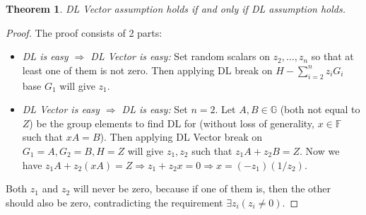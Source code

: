 \documentclass{article}
\newtheorem{theorem}{Theorem}[section]
\begin{document}
\begin{theorem}
DL Vector assumption holds if and only if DL assumption holds.
\end{theorem}
\begin{proof}
The proof consists of 2 parts:
    \begin{itemize}
    \item \textit{DL is easy $\Rightarrow$ DL Vector is easy:} Set random scalars on $z_2,\ldots,z_n$ so that at least one of them is not zero. Then applying DL break on $H - \sum_{i=2}^{n}{z_i G_i}$ base $G_1$ will give $z_1$.
    \item \textit{DL Vector is easy $\Rightarrow$ DL is easy:} Set $n=2$. Let $A, B\in\mathbb{G}$ (both not equal to $Z$) be the group elements to find DL for (without loss of generality, $x\in\mathbb{F}$ such that $xA=B$). Then applying DL Vector break on $G_1=A, G_2=B, H=Z$ will give $z_1, z_2$ such that $z_1 A + z_2 B = Z$. Now we have $z_1 A + z_2 (xA) = Z \Rightarrow z_1 + z_2 x = 0 \Rightarrow x = (-z_1)(1/z_2)$.
    \end{itemize}
Both $z_1$ and $z_2$ will never be zero, because if one of them is, then the other should also be zero, contradicting the requirement $\exists z_i(z_i \neq 0)$.
\end{proof}
%
%
\end{document}

